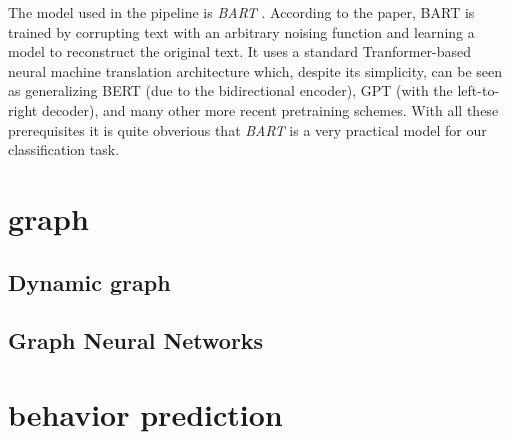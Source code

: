 The model used in the pipeline is \textit{BART} \cite{lewis2019bartdenoisingsequencetosequencepretraining}. According to the paper, BART is trained by corrupting text with an arbitrary noising function and learning a model to reconstruct the original text. It uses a standard Tranformer-based neural machine translation architecture which, despite its simplicity, can be seen as generalizing BERT (due to the bidirectional encoder), GPT (with the left-to-right decoder), and many other more recent pretraining schemes. With all these prerequisites it is quite obverious that \textit{BART} is a very practical model for our classification task.

\section{graph}




    \subsection{Dynamic graph}

    \subsection{Graph Neural Networks}

\section{behavior prediction}

